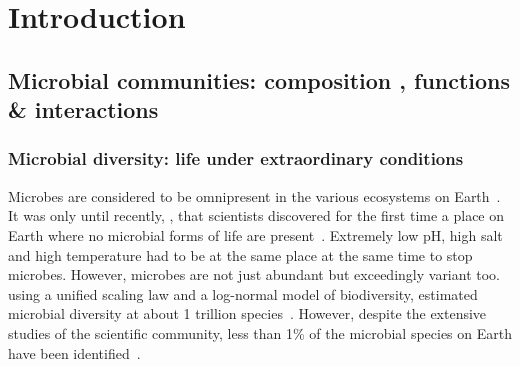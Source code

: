 \chapter{Introduction}
\label{cha:intro}



\section{Microbial communities: composition 
, functions 
\& interactions 
}
   \subsection{Microbial diversity: life under extraordinary conditions}
   \label{subsec:microbial_diversity}

      Microbes are considered to be omnipresent in the 
      various ecosystems on Earth~\citep{falkowski2008microbial}.
      It was only until recently, \citeyear{belilla2019hyperdiverse}, that scientists discovered for the first time 
      a place on Earth where no microbial forms of life are present~\citep{belilla2019hyperdiverse}.
      Extremely low pH, high salt and high temperature had to be 
      at the same place at the same time to stop microbes.
      However, microbes are not just abundant but 
      exceedingly variant too.
      \citeauthor{locey2016scaling} using a unified scaling law
      and a log-normal model of biodiversity, 
      estimated microbial diversity at about 1 trillion species~\citep{locey2016scaling}.
      However, despite the extensive studies of the scientific community, 
      less than 1\% of the microbial species on Earth have been identified~\citep{isme}.
      
